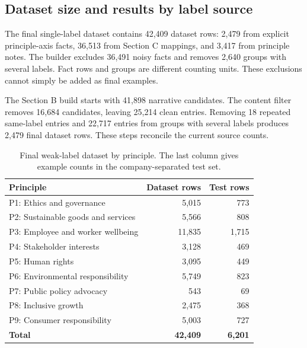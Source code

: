 \subsection{Dataset size and results by label source}
\label{sec:eval_sources}

The final single-label dataset contains 42,409 dataset rows: 2,479 from explicit principle-axis facts, 36,513 from Section C mappings, and 3,417 from principle notes. The builder excludes 36,491 noisy facts and removes 2,640 groups with several labels. Fact rows and groups are different counting units. These exclusions cannot simply be added as final examples.

The Section B build starts with 41,898 narrative candidates. The content filter removes 16,684 candidates, leaving 25,214 clean entries. Removing 18 repeated same-label entries and 22,717 entries from groups with several labels produces 2,479 final dataset rows. These steps reconcile the current source counts.

\begin{table}[tbp]
\centering\small
\caption{Final weak-label dataset by principle. The last column gives example counts in the company-separated test set.}
\label{tab:class_counts}
\begin{tabularx}{\linewidth}{@{}Yr r@{}}
\toprule\textbf{Principle} & \textbf{Dataset rows} & \textbf{Test rows}\\\midrule
P1: Ethics and governance & 5,015 & 773\\
P2: Sustainable goods and services & 5,566 & 808\\
P3: Employee and worker wellbeing & 11,835 & 1,715\\
P4: Stakeholder interests & 3,128 & 469\\
P5: Human rights & 3,095 & 449\\
P6: Environmental responsibility & 5,749 & 823\\
P7: Public policy advocacy & 543 & 69\\
P8: Inclusive growth & 2,475 & 368\\
P9: Consumer responsibility & 5,003 & 727\\\midrule
\textbf{Total} & \textbf{42,409} & \textbf{6,201}\\\bottomrule
\end{tabularx}
\end{table}

